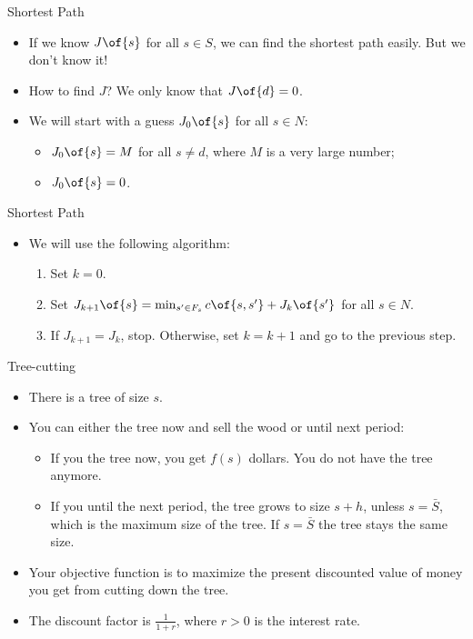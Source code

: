 \documentclass[11pt,xcolor={dvipsnames},aspectratio=159,hyperref={pdftex,pdfpagemode=UseNone,hidelinks,pdfdisplaydoctitle=true},usepdftitle=false]{beamer}
\begin{document}
\begin{frame}{Shortest Path}   
    \begin{itemize}
    \item  If we know $J\of{s}$ for all $s\in S$, we can find the shortest path easily. But we don't know it! 
    \item  How to find $J$? We only know that $J\of{d} = 0$. 
    \item  We will start with a guess $J_0\of{s}$ for all $s\in N$: \begin{itemize} 
        \item $J_0\of{s} = M$ for all $s\neq d$, where $M$ is a very large number;
        \item $J_0\of{s} = 0$.
    \end{itemize}
\end{itemize}
\end{frame}

\begin{frame}{Shortest Path}   
    \begin{itemize}
    \item We will use the following algorithm: \begin{enumerate}
    \item Set $k=0$.
    \item Set $J_{k+1}\of{s} = \min_{s'\in F_s} c\of{s,s'} + J_k\of{s'}$ for all $s\in N$.
    \item If $J_{k+1} = J_k$, stop. Otherwise, set $k = k+1$ and go to the previous step.
    \end{enumerate}

    \end{itemize}
\end{frame}


\begin{frame}
\end{frame}


\begin{frame}{Tree-cutting}   
    \begin{itemize}
    \item  There is a tree of size $s$. 
    \item  You can either   the tree now and sell the wood or  until next period: \begin{itemize} 
    \item  If you   the tree now, you get $f(s)$ dollars. You do not have the tree anymore. 
    \item  If you  until the next period, the tree grows to size $s+h$, unless $s = \bar{S}$, which is the maximum size of the tree. If $s=\bar{S}$ the tree stays the same size.
    \end{itemize}
    \item  Your objective function is to maximize the present discounted value of money you get from cutting down the tree. 
    \item  The discount factor is $\frac{1}{1+r}$, where $r>0$ is the interest rate.
\end{itemize}
\end{frame}
\end{document}
